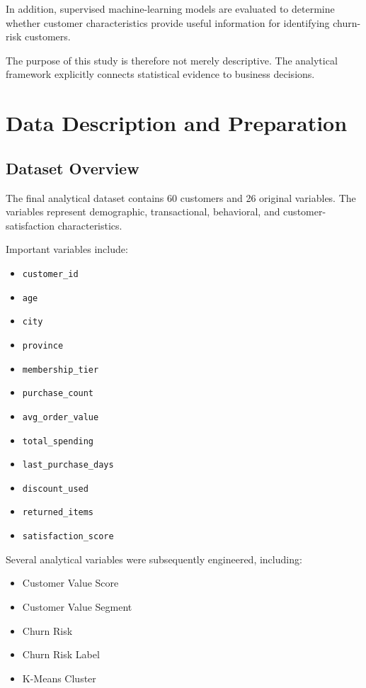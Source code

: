 \documentclass[11pt,a4paper]{article}
\begin{document}
In addition, supervised machine-learning models are evaluated to determine whether customer characteristics provide useful information for identifying churn-risk customers.

The purpose of this study is therefore not merely descriptive. The analytical framework explicitly connects statistical evidence to business decisions.


\section{Data Description and Preparation}

\subsection{Dataset Overview}

The final analytical dataset contains 60 customers and 26 original variables. The variables represent demographic, transactional, behavioral, and customer-satisfaction characteristics.

Important variables include:

\begin{itemize}
    \item \texttt{customer\_id}
    \item \texttt{age}
    \item \texttt{city}
    \item \texttt{province}
    \item \texttt{membership\_tier}
    \item \texttt{purchase\_count}
    \item \texttt{avg\_order\_value}
    \item \texttt{total\_spending}
    \item \texttt{last\_purchase\_days}
    \item \texttt{discount\_used}
    \item \texttt{returned\_items}
    \item \texttt{satisfaction\_score}
\end{itemize}

Several analytical variables were subsequently engineered, including:

\begin{itemize}
    \item Customer Value Score
    \item Customer Value Segment
    \item Churn Risk
    \item Churn Risk Label
    \item K-Means Cluster
\end{itemize}
\end{document}
